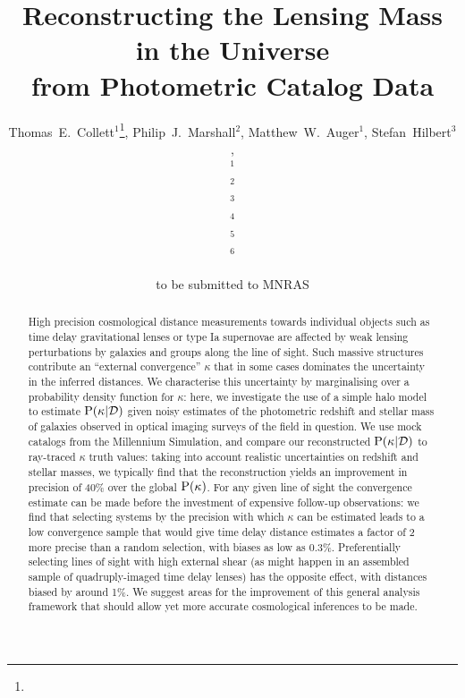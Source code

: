 \documentclass[useAMS,usenatbib]{mn2e}
\title[Line of Sight Mass Reconstruction]
{Reconstructing the Lensing Mass in the Universe \\
from Photometric Catalog Data}
\author[Collett \etal]{%
  Thomas~E.~Collett$^{1}$\thanks{\collettemail},
  Philip~J.~Marshall$^{2}$,
  Matthew~W.~Auger$^{1}$,
  Stefan~Hilbert$^{3}$,
\newauthor{%
  Sherry~H.~Suyu$^{4}$,
  Zachary~Greene$^{4}$,
  Tommaso~Treu$^{4}$\thanks{\packard},
  Vasiliy~Belokurov$^{1}$,}
\newauthor{%
  Christopher~D.~Fassnacht$^{5}$,
  L\`eon~V.~E.~Koopmans$^{6}$,
  Roger~D.~Blandford$^{3}$} 
  \medskip\\
  $^1$\ioa\\
  $^2$\oxford\\
  $^3$\kipac\\
  $^4$\ucsb\\
  $^5$\davis\\
  $^6$\kapteyn
}
\begin{document}
             
\date{to be submitted to MNRAS}
\pagerange{\pageref{firstpage}--\pageref{lastpage}}

\maketitle           

\label{firstpage}


\begin{abstract} 

High precision cosmological distance measurements towards individual objects
such as time delay gravitational lenses or type Ia supernovae are affected by
weak lensing perturbations by galaxies and groups along the line of sight.
Such massive structures contribute an ``external convergence'' $\kappa$ that
in some cases dominates the uncertainty in the inferred distances.  We
characterise this uncertainty by marginalising over a probability density
function for $\kappa$: here, we investigate the use of a simple halo model to
estimate ${\rm P}(\kappa|{\mathcal{D}})$ given noisy estimates of the photometric redshift
and stellar mass of galaxies observed in optical imaging surveys of the field
in question. We use mock catalogs from the Millennium Simulation, and compare
our reconstructed ${\rm P}(\kappa|{\mathcal{D}})$ to ray-traced $\kappa$ truth values: 
taking into account realistic uncertainties on redshift and stellar masses, we
typically find that the reconstruction yields an improvement in precision of
40\% over the global ${\rm P}(\kappa)$. For any given line of sight the
convergence estimate can be made before the investment of expensive follow-up
observations: we find that selecting systems by the precision with which
$\kappa$ can be estimated leads to a low convergence  sample that would give
time delay distance estimates a factor of 2 more precise than a random
selection,  with biases as low as 0.3\%. Preferentially selecting lines of
sight with high external shear (as might happen in an assembled sample of
quadruply-imaged time delay lenses) has the opposite effect, with distances
biased by around 1\%. We suggest areas for the improvement of this general
analysis framework that should allow yet more accurate cosmological inferences
to be made.

\end{abstract}

\end{document}

